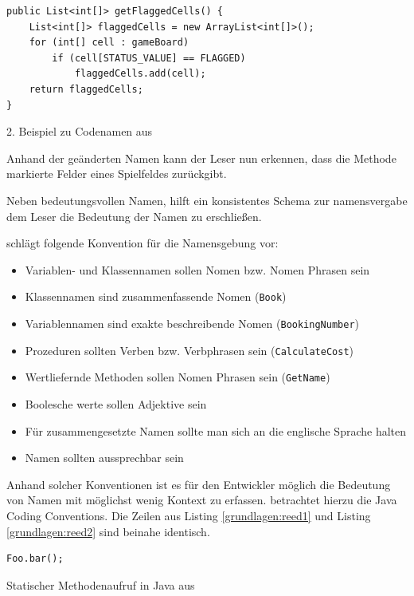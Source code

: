 \begin{listing}
    \begin{verbatim}
public List<int[]> getFlaggedCells() {
    List<int[]> flaggedCells = new ArrayList<int[]>();
    for (int[] cell : gameBoard)
        if (cell[STATUS_VALUE] == FLAGGED)
            flaggedCells.add(cell);
    return flaggedCells;
}
    \end{verbatim}
    \caption{2. Beispiel zu Codenamen aus \cite[S. 47]{Martin}}
    \label{grundlagen:naminggood}
\end{listing}

Anhand der geänderten Namen kann der Leser nun erkennen, dass die Methode markierte Felder eines Spielfeldes zurückgibt.

Neben bedeutungsvollen Namen, hilft ein konsistentes Schema zur namensvergabe dem Leser die Bedeutung der Namen zu erschließen. 

\cite[S. 4]{Green} schlägt folgende Konvention für die Namensgebung vor:
\begin{itemize}
	\item Variablen- und Klassennamen sollen Nomen bzw. Nomen Phrasen sein
	\item Klassennamen sind zusammenfassende Nomen (\texttt{Book})
	\item Variablennamen sind exakte beschreibende Nomen (\texttt{BookingNumber})
	\item Prozeduren sollten Verben bzw. Verbphrasen sein (\texttt{CalculateCost})
	\item Wertliefernde Methoden sollen Nomen Phrasen sein (\texttt{GetName}) 
	\item Boolesche werte sollen Adjektive sein
	\item Für zusammengesetzte Namen sollte man sich an die englische Sprache halten
	\item Namen sollten aussprechbar sein
\end{itemize}

Anhand solcher Konventionen ist es für den Entwickler möglich die Bedeutung von Namen mit möglichst wenig Kontext zu erfassen.
\cite{reed} betrachtet hierzu die Java Coding Conventions. Die Zeilen aus Listing \ref{grundlagen:reed1} und
Listing \ref{grundlagen:reed2} sind beinahe identisch. 

\begin{listing}
    \begin{verbatim}
Foo.bar();
    \end{verbatim}
    \caption{Statischer Methodenaufruf in Java aus \cite[S. 182]{reed}}
    \label{grundlagen:reed1}
\end{listing}

